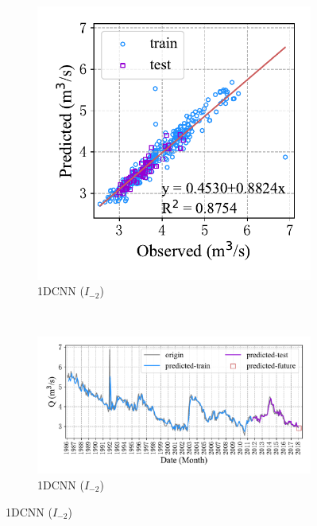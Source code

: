 \begin{figure}[!htbp]
\begin{subfigure}[b]{0.615\textwidth}
  \end{subfigure}
  \\
  \begin{subfigure}[b]{0.305\textwidth}
    \includegraphics[width=\textwidth]{Img/chap4_spr/spr_scatter_in_2_out_1_cnn.pdf}
    \vspace{-1.2cm}
    \caption{1DCNN ($I_{-2}$)}
    \label{fig:spr_scatter_in_2_out_1_cnn}
  \end{subfigure}
  ~
  \begin{subfigure}[b]{0.615\textwidth}
    \includegraphics[width=\textwidth]{Img/chap4_spr/spr_series_in_2_out_1_cnn.pdf}
    \vspace{-1.2cm}
    \caption{1DCNN ($I_{-2}$)}
    \label{fig:spr_series_in_2_out_1_cnn}

\end{subfigure}
\end{figure}
